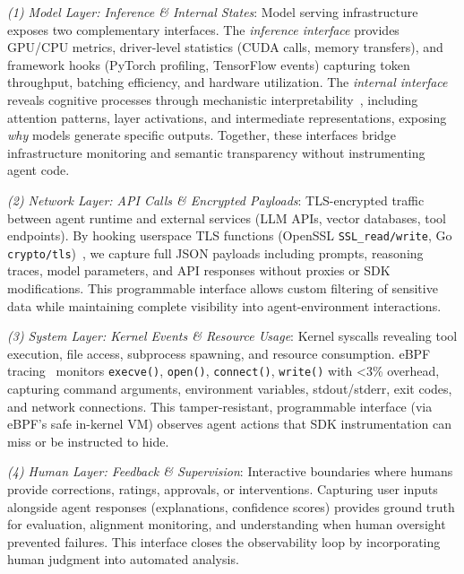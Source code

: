 \documentclass[sigplan,screen,9pt]{acmart}
\begin{document}
\emph{(1) Model Layer: Inference \& Internal States}: Model serving infrastructure exposes two complementary interfaces. The \emph{inference interface} provides GPU/CPU metrics, driver-level statistics (CUDA calls, memory transfers), and framework hooks (PyTorch profiling, TensorFlow events) capturing token throughput, batching efficiency, and hardware utilization. The \emph{internal interface} reveals cognitive processes through mechanistic interpretability~\cite{Kim2025AgenticInterp}, including attention patterns, layer activations, and intermediate representations, exposing \emph{why} models generate specific outputs. Together, these interfaces bridge infrastructure monitoring and semantic transparency without instrumenting agent code.

\emph{(2) Network Layer: API Calls \& Encrypted Payloads}: TLS-encrypted traffic between agent runtime and external services (LLM APIs, vector databases, tool endpoints). By hooking userspace TLS functions (OpenSSL \texttt{SSL\_read/write}, Go \texttt{crypto/tls})~\cite{zheng2025extending}, we capture full JSON payloads including prompts, reasoning traces, model parameters, and API responses without proxies or SDK modifications. This programmable interface allows custom filtering of sensitive data while maintaining complete visibility into agent-environment interactions.

\emph{(3) System Layer: Kernel Events \& Resource Usage}: Kernel syscalls revealing tool execution, file access, subprocess spawning, and resource consumption. eBPF tracing~\cite{brendangregg,ebpfio} monitors \texttt{execve()}, \texttt{open()}, \texttt{connect()}, \texttt{write()} with <3\% overhead, capturing command arguments, environment variables, stdout/stderr, exit codes, and network connections. This tamper-resistant, programmable interface (via eBPF's safe in-kernel VM) observes agent actions that SDK instrumentation can miss or be instructed to hide.

\emph{(4) Human Layer: Feedback \& Supervision}: Interactive boundaries where humans provide corrections, ratings, approvals, or interventions. Capturing user inputs alongside agent responses (explanations, confidence scores) provides ground truth for evaluation, alignment monitoring, and understanding when human oversight prevented failures. This interface closes the observability loop by incorporating human judgment into automated analysis.
\end{document}

